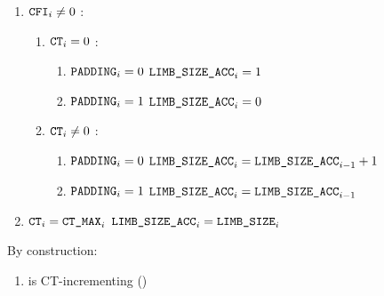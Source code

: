 \begin{enumerate}
	\item \If $\texttt{CFI} _{i} \neq 0$ \Then:
		\begin{enumerate}
			\item \If $\texttt{CT} _{i} = 0$ \Then:
				\begin{enumerate}
					\item \If $\texttt{PADDING} _{i} = 0$ \Then $\texttt{LIMB\_SIZE\_ACC} _{i} = 1$
					\item \If $\texttt{PADDING} _{i} = 1$ \Then $\texttt{LIMB\_SIZE\_ACC} _{i} = 0$
				\end{enumerate}
			\item \If $\texttt{CT} _{i} \neq 0$ \Then:
				\begin{enumerate}
					\item \If $\texttt{PADDING} _{i} = 0$ \Then $\texttt{LIMB\_SIZE\_ACC} _{i} = \texttt{LIMB\_SIZE\_ACC} _{i-1}+1$
					\item \If $\texttt{PADDING} _{i} = 1$ \Then $\texttt{LIMB\_SIZE\_ACC} _{i} = \texttt{LIMB\_SIZE\_ACC} _{i-1}$
				\end{enumerate}
		\end{enumerate}
	\item \If $\texttt{CT} _{i} = \texttt{CT\_MAX} _{i}$ \Then $\texttt{LIMB\_SIZE\_ACC} _{i} = \texttt{LIMB\_SIZE} _{i}$
\end{enumerate}
\saNote{} By construction:
\begin{enumerate}[resume]
	\item \romColumnLimbByteSizeAcc{} is CT-incrementing \quad (\trash)
\end{enumerate}

